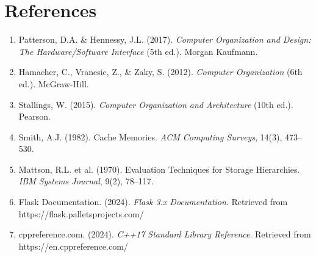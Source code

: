 \documentclass[12pt,a4paper]{report}
\begin{document}
\chapter*{References}
\begin{enumerate}
  \item Patterson, D.A. \& Hennessy, J.L. (2017). \textit{Computer Organization and Design: The Hardware/Software Interface} (5th ed.). Morgan Kaufmann.
  \item Hamacher, C., Vranesic, Z., \& Zaky, S. (2012). \textit{Computer Organization} (6th ed.). McGraw-Hill.
  \item Stallings, W. (2015). \textit{Computer Organization and Architecture} (10th ed.). Pearson.
  \item Smith, A.J. (1982). Cache Memories. \textit{ACM Computing Surveys}, 14(3), 473--530.
  \item Mattson, R.L. et al. (1970). Evaluation Techniques for Storage Hierarchies. \textit{IBM Systems Journal}, 9(2), 78--117.
  \item Flask Documentation. (2024). \textit{Flask 3.x Documentation}. Retrieved from https://flask.palletsprojects.com/
  \item cppreference.com. (2024). \textit{C++17 Standard Library Reference}. Retrieved from https://en.cppreference.com/
\end{enumerate}
\end{document}
